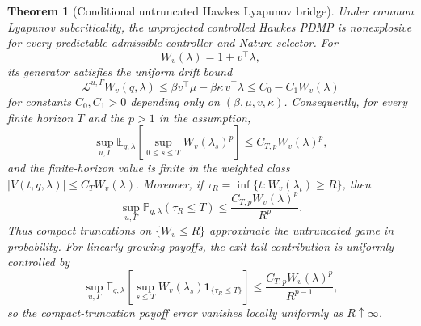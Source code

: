 \documentclass[11pt]{article}
\newtheorem{theorem}[assumption]{Theorem}
\newcommand{\E}{\mathbb{E}}
\begin{document}
\begin{theorem}[Conditional untruncated Hawkes Lyapunov bridge]
Under common Lyapunov subcriticality, the unprojected controlled Hawkes PDMP is
nonexplosive for every predictable admissible controller and Nature selector.
For
\[
W_v(\lambda)=1+v^\top\lambda,
\]
its generator satisfies the uniform drift bound
\[
\mathcal L^{u,\Gamma}W_v(q,\lambda)
\le
\beta v^\top\mu-\beta\kappa\, v^\top\lambda
\le C_0-C_1 W_v(\lambda)
\]
for constants $C_0,C_1>0$ depending only on
$(\beta,\mu,v,\kappa)$. Consequently, for every finite horizon $T$ and the
$p>1$ in the assumption,
\[
\sup_{u,\Gamma}\E_{q,\lambda}\left[\sup_{0\le s\le T} W_v(\lambda_s)^p\right]
\le C_{T,p} W_v(\lambda)^p,
\]
and the finite-horizon value is finite in the weighted class
$
|V(t,q,\lambda)|\le C_T W_v(\lambda).
$
Moreover, if $\tau_R=\inf\{t:W_v(\lambda_t)\ge R\}$, then
\[
\sup_{u,\Gamma}\mathbb P_{q,\lambda}(\tau_R\le T)
\le \frac{C_{T,p} W_v(\lambda)^p}{R^p}.
\]
Thus compact truncations on $\{W_v\le R\}$ approximate the untruncated game in
probability. For linearly growing payoffs, the exit-tail contribution is
uniformly controlled by
\[
\sup_{u,\Gamma}
\E_{q,\lambda}\!\left[
\sup_{s\le T}W_v(\lambda_s)\mathbf 1_{\{\tau_R\le T\}}
\right]
\le
\frac{C_{T,p}W_v(\lambda)^p}{R^{p-1}},
\]
so the compact-truncation payoff error vanishes locally uniformly as
$R\uparrow\infty$.
\end{theorem}
\end{document}

